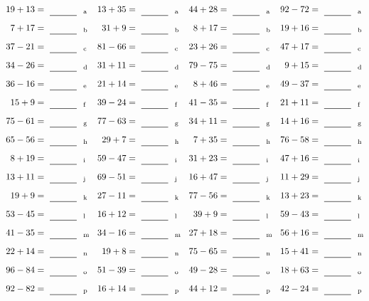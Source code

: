 \documentclass
[
  draft    = true,
  fontsize = 11pt,
  parskip  = half-
]
{scrartcl}
\begin{document}
\clearpage
\begin{align*}
    \pline{19+13}&=\rline{a}
  & \pline{13+35}&=\rline{a}
  & \pline{44+28}&=\rline{a}
  & \pline{92-72}&=\rline{a} \\[1ex]
    \pline{7+17}&=\rline{b}
  & \pline{31+9}&=\rline{b}
  & \pline{8+17}&=\rline{b}
  & \pline{19+16}&=\rline{b} \\[1ex]
    \pline{37-21}&=\rline{c}
  & \pline{81-66}&=\rline{c}
  & \pline{23+26}&=\rline{c}
  & \pline{47+17}&=\rline{c} \\[1ex]
    \pline{34-26}&=\rline{d}
  & \pline{31+11}&=\rline{d}
  & \pline{79-75}&=\rline{d}
  & \pline{9+15}&=\rline{d} \\[1ex]
    \pline{36-16}&=\rline{e}
  & \pline{21+14}&=\rline{e}
  & \pline{8+46}&=\rline{e}
  & \pline{49-37}&=\rline{e} \\[1ex]
    \pline{15+9}&=\rline{f}
  & \pline{39-24}&=\rline{f}
  & \pline{41-35}&=\rline{f}
  & \pline{21+11}&=\rline{f} \\[1ex]
    \pline{75-61}&=\rline{g}
  & \pline{77-63}&=\rline{g}
  & \pline{34+11}&=\rline{g}
  & \pline{14+16}&=\rline{g} \\[1ex]
    \pline{65-56}&=\rline{h}
  & \pline{29+7}&=\rline{h}
  & \pline{7+35}&=\rline{h}
  & \pline{76-58}&=\rline{h} \\[1ex]
    \pline{8+19}&=\rline{i}
  & \pline{59-47}&=\rline{i}
  & \pline{31+23}&=\rline{i}
  & \pline{47+16}&=\rline{i} \\[1ex]
    \pline{13+11}&=\rline{j}
  & \pline{69-51}&=\rline{j}
  & \pline{16+47}&=\rline{j}
  & \pline{11+29}&=\rline{j} \\[1ex]
    \pline{19+9}&=\rline{k}
  & \pline{27-11}&=\rline{k}
  & \pline{77-56}&=\rline{k}
  & \pline{13+23}&=\rline{k} \\[1ex]
    \pline{53-45}&=\rline{l}
  & \pline{16+12}&=\rline{l}
  & \pline{39+9}&=\rline{l}
  & \pline{59-43}&=\rline{l} \\[1ex]
    \pline{41-35}&=\rline{m}
  & \pline{34-16}&=\rline{m}
  & \pline{27+18}&=\rline{m}
  & \pline{56+16}&=\rline{m} \\[1ex]
    \pline{22+14}&=\rline{n}
  & \pline{19+8}&=\rline{n}
  & \pline{75-65}&=\rline{n}
  & \pline{15+41}&=\rline{n} \\[1ex]
    \pline{96-84}&=\rline{o}
  & \pline{51-39}&=\rline{o}
  & \pline{49-28}&=\rline{o}
  & \pline{18+63}&=\rline{o} \\[1ex]
    \pline{92-82}&=\rline{p}
  & \pline{16+14}&=\rline{p}
  & \pline{44+12}&=\rline{p}
  & \pline{42-24}&=\rline{p}
\end{align*}
\end{document}
